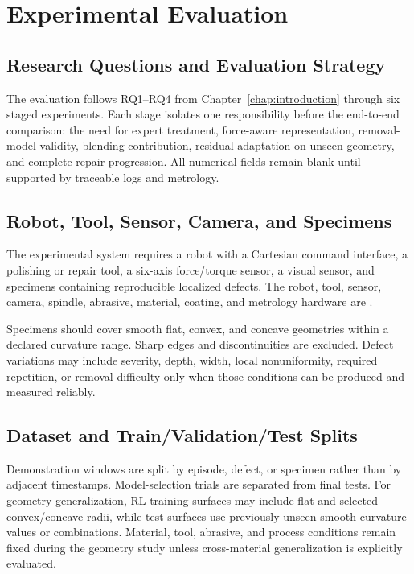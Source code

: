 \chapter{Experimental Evaluation}
\label{chap:experiments}

\section{Research Questions and Evaluation Strategy}
The evaluation follows RQ1--RQ4 from Chapter~\ref{chap:introduction} through six staged experiments. Each stage isolates one responsibility before the end-to-end comparison: the need for expert treatment, force-aware representation, removal-model validity, blending contribution, residual adaptation on unseen geometry, and complete repair progression. All numerical fields remain blank until supported by traceable logs and metrology.

\section{Robot, Tool, Sensor, Camera, and Specimens}
The experimental system requires a robot with a Cartesian command interface, a polishing or repair tool, a six-axis force/torque sensor, a visual sensor, and specimens containing reproducible localized defects. The robot, tool, sensor, camera, spindle, abrasive, material, coating, and metrology hardware are .

Specimens should cover smooth flat, convex, and concave geometries within a declared curvature range. Sharp edges and discontinuities are excluded. Defect variations may include severity, depth, width, local nonuniformity, required repetition, or removal difficulty only when those conditions can be produced and measured reliably.

\section{Dataset and Train/Validation/Test Splits}
Demonstration windows are split by episode, defect, or specimen rather than by adjacent timestamps. Model-selection trials are separated from final tests. For geometry generalization, RL training surfaces may include flat and selected convex/concave radii, while test surfaces use previously unseen smooth curvature values or combinations. Material, tool, abrasive, and process conditions remain fixed during the geometry study unless cross-material generalization is explicitly evaluated.

